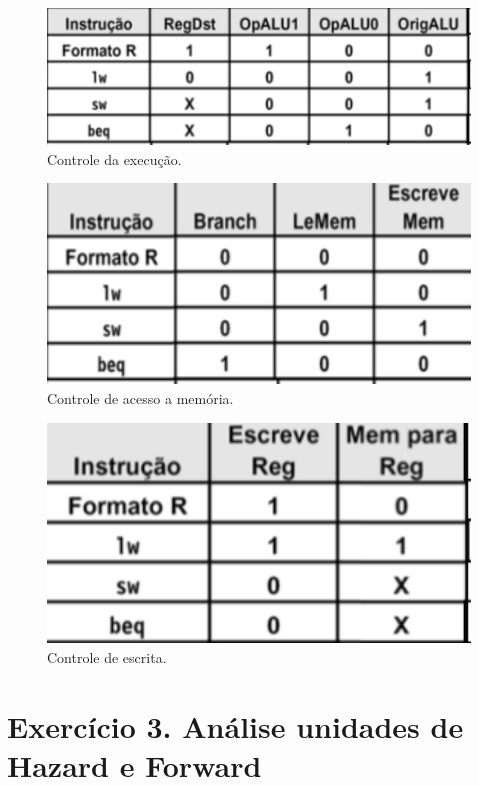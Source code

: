 \documentclass[12pt]{article}
\begin{document}
\begin{figure}[H]
	\flushleft
	\includegraphics[width=1\textwidth]{ex.png}
	\caption{Controle da execução.}
	\label{fig:pfunct}
\end{figure}
\begin{figure}[H]
	\flushleft
	\includegraphics[width=1\textwidth]{mem.png}
	\caption{Controle de acesso a memória.}
	\label{fig:pfunct}
\end{figure}
\begin{figure}[H]
	\flushleft
	\includegraphics[width=1\textwidth]{escrita.png}
	\caption{Controle de escrita.}
	\label{fig:pfunct}
\end{figure}
\section{Exercício 3. Análise unidades de Hazard e Forward}
\label{sec:hazardforward}
\end{document}
